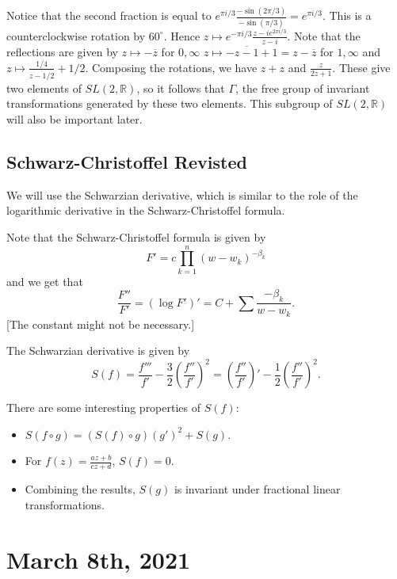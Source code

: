 \documentclass[12pt]{scrartcl}
\newcommand{\R}{\mathbb{R}}
\let \ol \overline
\begin{document}
Notice that the second fraction is equal to $e^{\pi i/3} \frac{- \sin(2\pi/3)}{- \sin(\pi/3)} = e^{\pi i /3}$.  This is a counterclockwise rotation by $60^\circ$.  Hence $z \mapsto e^{-\pi i/3} \frac{z - ie^{2\pi i /3}}{z - i}$.  Note that the reflections are given by $z \mapsto - \ol{z}$ for $0, \infty$ $z \mapsto - \ol{z - 1} + 1 = z - \ol{z}$ for $1, \infty$ and $z \mapsto \frac{1/4}{\ol{z - 1/2}}+1/2$.  Composing the rotations, we have $z + z$ and $\frac{z}{2z+1}$.  These give two elements of $SL(2, \R)$, so it follows that $\Gamma$, the free group of invariant transformations generated by these two elements.   This subgroup of $SL(2, \R)$ will also be important later.  

\subsection{Schwarz-Christoffel Revisted}

We will use the Schwarzian derivative, which is similar to the role of the logarithmic derivative in the Schwarz-Christoffel formula. 

Note that the Schwarz-Christoffel formula is given by 
$$F' = c\prod_{k=1}^n (w - w_k)^{-\beta_k}$$
and we get that $$\frac{F''}{F'} = (\log F')' = C + \sum\frac{-\beta_k}{w - w_k}.$$
[The constant might not be necessary.]

The Schwarzian derivative is given by
$$S(f) = \frac{f'''}{f'} - \frac{3}{2}\left (\frac{f''}{f'}\right )^2 = \left (\frac{f''}{f'}\right )' - \frac{1}{2} \left (\frac{f''}{f'}\right )^2.$$

There are some interesting properties of $S(f)$: 
\begin{itemize}
\item $S(f \circ g) = (S(f) \circ g)(g')^2 + S(g)$.
\item For $f(z) = \frac{az+ b}{cz + d}$, $S(f) = 0$.
\item Combining the results, $S(g)$ is invariant under fractional linear transformations.  
\end{itemize}

\pagebreak
\section{March 8th, 2021}
\end{document}
